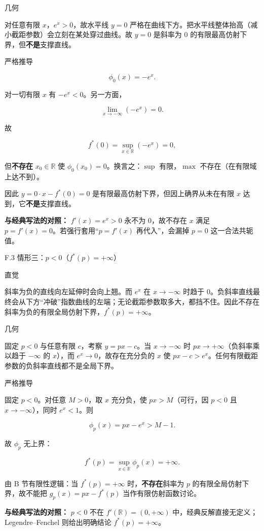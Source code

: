 \documentclass[
    lang=cn,
    color=blue,
    mode=fancy,
    thmcnt=section,
    scheme=chinese
]{elegantbook}
\begin{document}
几何

对任意有限 $x$，$e^x > 0$，故水平线 $y = 0$ 严格在曲线下方。把水平线整体抬高（减小截距参数）会立刻在某处穿过曲线。故 $y = 0$ 是斜率为 $0$ 的有限最高仿射下界，但\textbf{不是}支撑直线。

严格推导

\[
\phi_0(x) = -e^x.
\]

对一切有限 $x$ 有 $-e^x < 0$。另一方面，

\[
\lim_{x \to -\infty} (-e^x) = 0.
\]

故

\[
f^*(0) = \sup_{x \in \mathbb{R}} (-e^x) = 0,
\]

但\textbf{不存在} $x_0 \in \mathbb{R}$ 使 $\phi_0(x_0) = 0$。换言之：$\sup$ 有限，$\max$ 不存在（在有限域上达不到）。

因此 $y = 0 \cdot x - f^*(0) = 0$ 是有限最高仿射下界，但因上确界从未在有限 $x$ 达到，它\textbf{不是}支撑直线。

\textbf{与经典写法的对照：} $f'(x) = e^x > 0$ 永不为 $0$，故不存在 $x$ 满足 $p = f'(x) = 0$。若强行套用“$p = f'(x)$ 再代入”，会漏掉 $p = 0$ 这一合法共轭值。

\par
F.3 情形三：$p < 0$（$f^*(p) = +\infty$）

直觉

斜率为负的直线向左延伸时会向上翘。而 $e^x$ 在 $x \to -\infty$ 时趋于 $0$。负斜率直线最终会从下方“冲破”指数曲线的左端；无论截距参数取多大，都挡不住。因此不存在斜率为负的有限全局仿射下界，$f^*(p) = +\infty$。

几何

固定 $p < 0$ 与任意有限 $c$，考察 $y = px - c$。当 $x \to -\infty$ 时 $px \to +\infty$（负斜率乘以趋于 $-\infty$ 的 $x$），而 $e^x \to 0$，故存在充分负的 $x$ 使 $px - c > e^x$。任何有限截距参数的负斜率直线都不是全局下界。

严格推导

固定 $p < 0$。对任意 $M > 0$，取 $x$ 充分负，使 $px > M$（可行，因 $p < 0$ 且 $x \to -\infty$），同时 $e^x < 1$。则

\[
\phi_p(x) = px - e^x > M - 1.
\]

故 $\phi_p$ 无上界：

\[
f^*(p) = \sup_{x \in \mathbb{R}} \phi_p(x) = +\infty.
\]

由 B 节有限性逻辑：当 $f^*(p) = +\infty$ 时，\textbf{不存在}斜率为 $p$ 的有限全局仿射下界，故不能把 $g_p(x) = px - f^*(p)$ 当作有限仿射函数讨论。

\textbf{与经典写法的对照：} $p < 0$ 不在 $f'(\mathbb{R}) = (0,+\infty)$ 中，经典反解直接无定义；Legendre–Fenchel 则给出明确结论 $f^*(p) = +\infty$。
\end{document}
